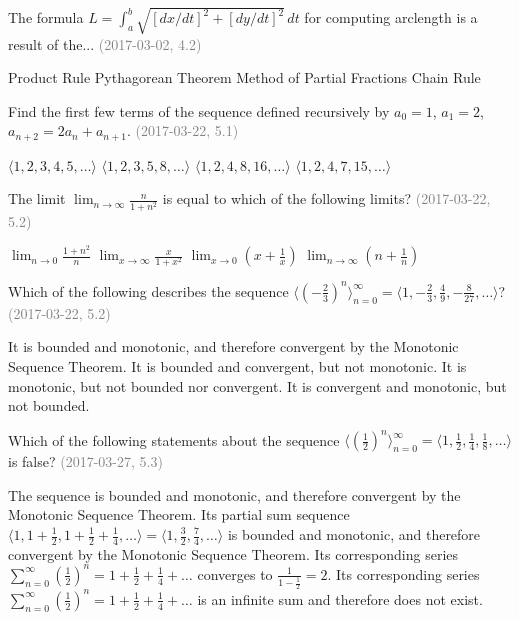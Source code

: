 \documentclass[12pt]{exam}
\newcommand{\questionDate}[1]{\textcolor{gray}{(#1)}}
\newcommand{\<}{\langle}
\renewcommand{\>}{\rangle}
\begin{document}
\begin{questions}
  \question
  The formula \(L=\int_a^b\sqrt{[dx/dt]^2+[dy/dt]^2}\,dt\) for computing
  arclength is a result of the...
  \questionDate{2017-03-02, 4.2}
  \begin{choices}
    \choice
      Product Rule
    \CorrectChoice
      Pythagorean Theorem
    \choice
      Method of Partial Fractions
    \choice
      Chain Rule
  \end{choices}

\newpage

  \question
  Find the first few terms of the sequence defined recursively by
  \(a_0=1\), \(a_1=2\), \(a_{n+2}=2a_n+a_{n+1}\).
  \questionDate{2017-03-22, 5.1}
  \begin{choices}
    \choice
      \(\<1,2,3,4,5,\dots\>\)
    \choice
      \(\<1,2,3,5,8,\dots\>\)
    \CorrectChoice
      \(\<1,2,4,8,16,\dots\>\)
    \choice
      \(\<1,2,4,7,15,\dots\>\)
  \end{choices}

  \question
  The limit \(\displaystyle\lim_{n\to\infty}\frac{n}{1+n^2}\) is equal to
  which of the following limits?
  \questionDate{2017-03-22, 5.2}
  \begin{choices}
    \choice
      \(\displaystyle\lim_{n\to 0}\frac{1+n^2}{n}\)
    \CorrectChoice
      \(\displaystyle\lim_{x\to\infty}\frac{x}{1+x^2}\)
    \choice
      \(\displaystyle\lim_{x\to 0} \left(x+\frac{1}{x}\right)\)
    \choice
      \(\displaystyle\lim_{n\to\infty}\left(n+\frac{1}{n}\right)\)
  \end{choices}

  \question
  Which of the following describes the sequence
  \(
    \<(-\frac{2}{3})^n\>_{n=0}^\infty
  =
    \<1,-\frac{2}{3},\frac{4}{9},-\frac{8}{27},\dots\>
  \)?
  \questionDate{2017-03-22, 5.2}
  \begin{choices}
    \choice
      It is bounded and monotonic, and therefore convergent
      by the Monotonic Sequence Theorem.
    \CorrectChoice
      It is bounded and convergent, but not monotonic.
    \choice
      It is monotonic, but not bounded nor convergent.
    \choice
      It is convergent and monotonic, but not bounded.
  \end{choices}


\newpage

\question
Which of the following statements about the sequence
\(\<(\frac{1}{2})^n\>_{n=0}^\infty =
\<1,\frac{1}{2},\frac{1}{4},\frac{1}{8},\dots\>\) is false?
\questionDate{2017-03-27, 5.3}
\begin{choices}
  \choice
    The sequence is bounded and monotonic, and therefore convergent
    by the Monotonic Sequence Theorem.
  \choice
    Its partial sum sequence
    \(\<1,1+\frac{1}{2},1+\frac{1}{2}+\frac{1}{4},\dots\>=
    \<1,\frac{3}{2},\frac{7}{4},\dots\>\) is bounded and monotonic, and
    therefore convergent by the Monotonic Sequence Theorem.
  \choice
    Its corresponding series
    \(\sum_{n=0}^\infty (\frac{1}{2})^n=1+\frac{1}{2}+\frac{1}{4}+\dots\)
    converges to \(\frac{1}{1-\frac{1}{2}}=2\).
  \CorrectChoice
    Its corresponding series
    \(\sum_{n=0}^\infty (\frac{1}{2})^n=1+\frac{1}{2}+\frac{1}{4}+\dots\)
    is an infinite sum and therefore does not exist.
\end{choices}



\end{questions}
\end{document}
